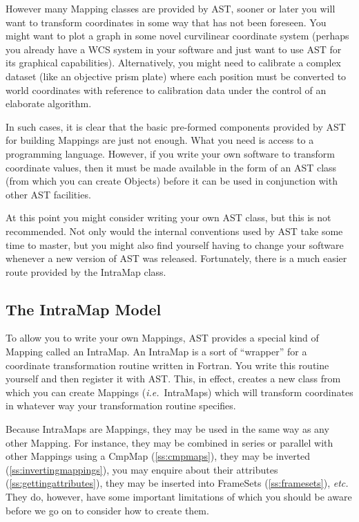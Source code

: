 \documentclass[twoside,11pt]{article}
\newcommand{\htmlref}[2]{#1}
\newcommand{\secref}[1]{\S\ref{#1}}
\renewcommand{\secref}[1]{\ref{#1}}
\begin{document}
However many \htmlref{Mapping}{Mapping} classes are provided by AST, sooner or later you
will want to transform coordinates in some way that has not been
foreseen. You might want to plot a graph in some novel curvilinear
coordinate system (perhaps you already have a WCS system in your
software and just want to use AST for its graphical capabilities).
Alternatively, you might need to calibrate a complex dataset (like an
objective prism plate) where each position must be converted to world
coordinates with reference to calibration data under the control of an
elaborate algorithm.

In such cases, it is clear that the basic pre-formed components
provided by AST for building Mappings are just not enough. What you
need is access to a programming language. However, if you write your
own software to transform coordinate values, then it must be made
available in the form of an AST class (from which you can create
Objects) before it can be used in conjunction with other AST
facilities.

At this point you might consider writing your own AST class, but this
is not recommended. Not only would the internal conventions used by
AST take some time to master, but you might also find yourself having
to change your software whenever a new version of AST was
released. Fortunately, there is a much easier route provided by the
\htmlref{IntraMap}{IntraMap} class.

\subsection{The IntraMap Model}

To allow you to write your own Mappings, AST provides a special kind
of \htmlref{Mapping}{Mapping} called an \htmlref{IntraMap}{IntraMap}. An IntraMap is a sort of ``wrapper''
for a coordinate transformation routine written in Fortran. You write
this routine yourself and then register it with AST. This, in effect,
creates a new class from which you can create Mappings
({\em{i.e.}}\ IntraMaps) which will transform coordinates in whatever
way your transformation routine specifies.

Because IntraMaps are Mappings, they may be used in the same way as
any other Mapping. For instance, they may be combined in series or
parallel with other Mappings using a \htmlref{CmpMap}{CmpMap} (\secref{ss:cmpmaps}),
they may be inverted (\secref{ss:invertingmappings}), you may enquire
about their attributes (\secref{ss:gettingattributes}), they may be
inserted into FrameSets (\secref{ss:framesets}), {\em{etc.}} They do,
however, have some important limitations of which you should be aware
before we go on to consider how to create them.
\end{document}
